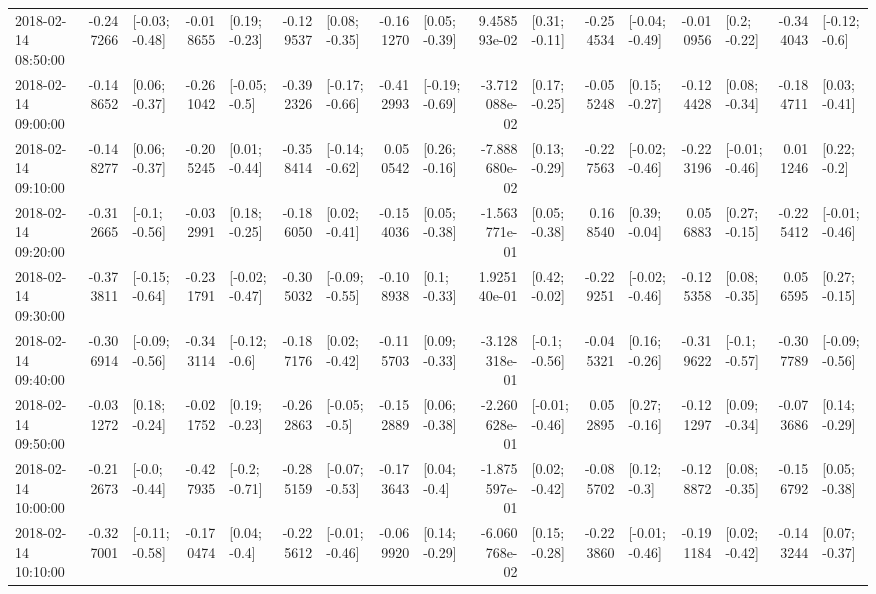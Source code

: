 \begin{tabular}{lrlrlrlrlrlrlrlrl}
2018-02-14 08:50:00 & -0.247266 &  [-0.03; -0.48] & -0.018655 &   [0.19; -0.23] & -0.129537 &   [0.08; -0.35] & -0.161270 &   [0.05; -0.39] &  9.458593e-02 &   [0.31; -0.11] & -0.254534 &  [-0.04; -0.49] & -0.010956 &    [0.2; -0.22] & -0.344043 &   [-0.12; -0.6] \\
2018-02-14 09:00:00 & -0.148652 &   [0.06; -0.37] & -0.261042 &   [-0.05; -0.5] & -0.392326 &  [-0.17; -0.66] & -0.412993 &  [-0.19; -0.69] & -3.712088e-02 &   [0.17; -0.25] & -0.055248 &   [0.15; -0.27] & -0.124428 &   [0.08; -0.34] & -0.184711 &   [0.03; -0.41] \\
2018-02-14 09:10:00 & -0.148277 &   [0.06; -0.37] & -0.205245 &   [0.01; -0.44] & -0.358414 &  [-0.14; -0.62] &  0.050542 &   [0.26; -0.16] & -7.888680e-02 &   [0.13; -0.29] & -0.227563 &  [-0.02; -0.46] & -0.223196 &  [-0.01; -0.46] &  0.011246 &    [0.22; -0.2] \\
2018-02-14 09:20:00 & -0.312665 &   [-0.1; -0.56] & -0.032991 &   [0.18; -0.25] & -0.186050 &   [0.02; -0.41] & -0.154036 &   [0.05; -0.38] & -1.563771e-01 &   [0.05; -0.38] &  0.168540 &   [0.39; -0.04] &  0.056883 &   [0.27; -0.15] & -0.225412 &  [-0.01; -0.46] \\
2018-02-14 09:30:00 & -0.373811 &  [-0.15; -0.64] & -0.231791 &  [-0.02; -0.47] & -0.305032 &  [-0.09; -0.55] & -0.108938 &    [0.1; -0.33] &  1.925140e-01 &   [0.42; -0.02] & -0.229251 &  [-0.02; -0.46] & -0.125358 &   [0.08; -0.35] &  0.056595 &   [0.27; -0.15] \\
2018-02-14 09:40:00 & -0.306914 &  [-0.09; -0.56] & -0.343114 &   [-0.12; -0.6] & -0.187176 &   [0.02; -0.42] & -0.115703 &   [0.09; -0.33] & -3.128318e-01 &   [-0.1; -0.56] & -0.045321 &   [0.16; -0.26] & -0.319622 &   [-0.1; -0.57] & -0.307789 &  [-0.09; -0.56] \\
2018-02-14 09:50:00 & -0.031272 &   [0.18; -0.24] & -0.021752 &   [0.19; -0.23] & -0.262863 &   [-0.05; -0.5] & -0.152889 &   [0.06; -0.38] & -2.260628e-01 &  [-0.01; -0.46] &  0.052895 &   [0.27; -0.16] & -0.121297 &   [0.09; -0.34] & -0.073686 &   [0.14; -0.29] \\
2018-02-14 10:00:00 & -0.212673 &   [-0.0; -0.44] & -0.427935 &   [-0.2; -0.71] & -0.285159 &  [-0.07; -0.53] & -0.173643 &    [0.04; -0.4] & -1.875597e-01 &   [0.02; -0.42] & -0.085702 &    [0.12; -0.3] & -0.128872 &   [0.08; -0.35] & -0.156792 &   [0.05; -0.38] \\
2018-02-14 10:10:00 & -0.327001 &  [-0.11; -0.58] & -0.170474 &    [0.04; -0.4] & -0.225612 &  [-0.01; -0.46] & -0.069920 &   [0.14; -0.29] & -6.060768e-02 &   [0.15; -0.28] & -0.223860 &  [-0.01; -0.46] & -0.191184 &   [0.02; -0.42] & -0.143244 &   [0.07; -0.37] \\

\end{tabular}
